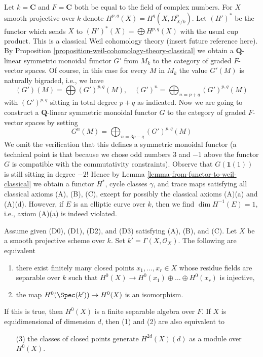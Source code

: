\begin{example}
\label{example-weird-weil}
Let $k = \mathbf{C}$ and $F = \mathbf{C}$ both be equal to the field
of complex numbers. For $X$ smooth projective over $k$ denote
$H^{p, q}(X) = H^q(X, \Omega^p_{X/k})$. Let $(H')^*$ be the functor
which sends $X$ to $(H')^*(X) = \bigoplus H^{p, q}(X)$ with the
usual cup product.
This is a classical Weil cohomology theory (insert future reference here).
By Proposition \ref{proposition-weil-cohomology-theory-classical}
we obtain a $\mathbf{Q}$-linear symmetric monoidal functor $G'$ from $M_k$
to the category of graded $F$-vector spaces. Of course, in this case
for every $M$ in $M_k$ the value $G'(M)$ is naturally bigraded, i.e.,
we have
$$
(G')(M) = \bigoplus (G')^{p, q}(M),\quad
(G')^n = \bigoplus\nolimits_{n = p + q} (G')^{p, q}(M)
$$
with $(G')^{p, q}$ sitting in total degree $p + q$ as indicated.
Now we are going to construct a $\mathbf{Q}$-linear symmetric monoidal functor
$G$ to the category of graded $F$-vector spaces by setting
$$
G^n(M) = \bigoplus\nolimits_{n = 3p - q} (G')^{p, q}(M)
$$
We omit the verification that this defines a symmetric monoidal
functor (a technical point is that because we chose odd numbers
$3$ and $-1$ above the functor $G$ is compatible with the
commutativity constraints).
Observe that $G(\mathbf{1}(1))$ is still sitting in degree $-2$!
Hence by Lemma \ref{lemma-from-functor-to-weil-classical}
we obtain a functor $H^*$, cycle classes $\gamma$, and trace maps
satisfying all classical axioms (A), (B), (C), except for possibly
the classical axioms (A)(a) and (A)(d).
However, if $E$ is an elliptic curve over $k$, then we find
$\dim H^{-1}(E) = 1$, i.e., axiom (A)(a) is indeed violated.
\end{example}

\begin{lemma}
\label{lemma-H-0-separable}
Assume given (D0), (D1), (D2), and (D3) satisfying (A), (B), and (C).
Let $X$ be a smooth projective scheme over $k$.
Set $k' = \Gamma(X, \mathcal{O}_X)$. The following are equivalent
\begin{enumerate}
\item there exist finitely many closed points $x_1, \ldots, x_r \in X$
whose residue fields are separable over $k$ such that
$H^0(X) \to H^0(x_1) \oplus \ldots \oplus H^0(x_r)$ is injective,
\item the map $H^0(\Spec(k')) \to H^0(X)$ is an isomorphism.
\end{enumerate}
If this is true, then $H^0(X)$ is a finite separable algebra over $F$.
If $X$ is equidimensional of dimension $d$, then (1) and (2)
are also equivalent to
\begin{enumerate}
\item[(3)] the classes of closed points generate $H^{2d}(X)(d)$
as a module over $H^0(X)$.
\end{enumerate}
\end{lemma}


